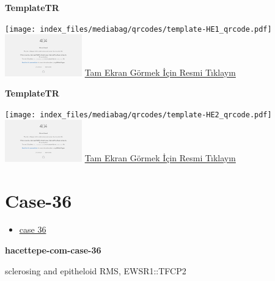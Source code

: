 \documentclass[
  letterpaper,
  DIV=11,
  numbers=noendperiod]{scrreprt}
\providecommand{\tightlist}{%
  \setlength{\itemsep}{0pt}\setlength{\parskip}{0pt}}\usepackage{longtable,booktabs,array}
\begin{document}
\textbf{TemplateTR}

\texttt{[image: index\_files/mediabag/qrcodes/template-HE1\_qrcode.pdf]}
\href{https://images.patolojiatlasi.com/template/HE1.html}{\includegraphics[width=0.25\textwidth,height=\textheight]{./screenshots/thumbnail_template-HE1.png}}
\href{https://images.patolojiatlasi.com/template/HE1.html}{Tam Ekran
Görmek İçin Resmi Tıklayın}

\textbf{TemplateTR}

\texttt{[image: index\_files/mediabag/qrcodes/template-HE2\_qrcode.pdf]}
\href{https://images.patolojiatlasi.com/template/HE2.html}{\includegraphics[width=0.25\textwidth,height=\textheight]{./screenshots/thumbnail_template-HE2.png}}
\href{https://images.patolojiatlasi.com/template/HE2.html}{Tam Ekran
Görmek İçin Resmi Tıklayın}

\hypertarget{sec-hacettepe-case-of-the-month-case-36}{%
\section{Case-36}\label{sec-hacettepe-case-of-the-month-case-36}}

\begin{itemize}
\tightlist
\item
  \href{https://www.youtube.com/watch?v=ga7KjbH3U1s&ab_channel=KemalKosemehmetoglu}{case
  36}
\end{itemize}

\textbf{hacettepe-com-case-36}

\begin{tcolorbox}[enhanced jigsaw, breakable, opacitybacktitle=0.6, arc=.35mm, colbacktitle=quarto-callout-tip-color!10!white, colback=white, toptitle=1mm, left=2mm, opacityback=0, colframe=quarto-callout-tip-color-frame, titlerule=0mm, rightrule=.15mm, bottomrule=.15mm, toprule=.15mm, bottomtitle=1mm, title=\textcolor{quarto-callout-tip-color}{\faLightbulb}\hspace{0.5em}{Tanı}, coltitle=black, leftrule=.75mm]

sclerosing and epitheloid RMS, EWSR1::TFCP2

\end{tcolorbox}
\end{document}
